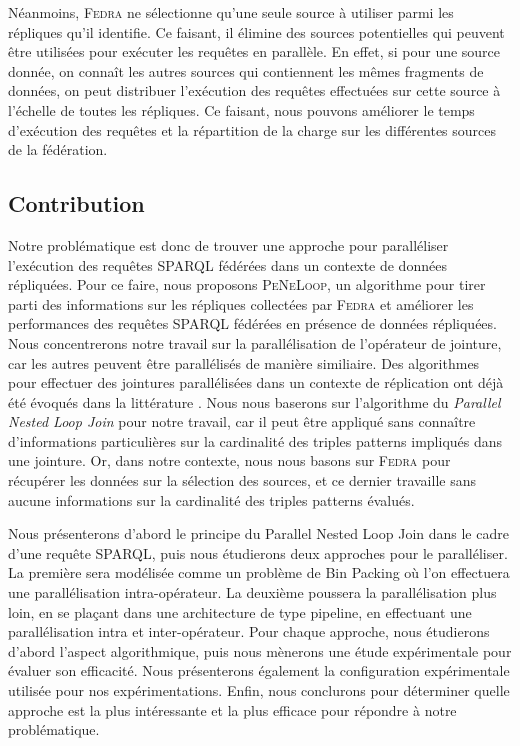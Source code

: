 \documentclass[a4paper]{article}
\def\sparql{\textsc{SPARQL}\xspace}
\def\fedra{\textsc{Fedra}\xspace}
\def\peneloop{\textsc{PeNeLoop}\xspace}
\begin{document}


Néanmoins, \fedra ne sélectionne qu'une seule source à utiliser parmi les répliques qu'il identifie. Ce faisant, il élimine des sources potentielles qui peuvent être utilisées pour exécuter les requêtes en parallèle. En effet, si pour une source donnée, on connaît les autres sources qui contiennent les mêmes fragments de données, on peut distribuer l'exécution des requêtes effectuées sur cette source à l'échelle de toutes les répliques. Ce faisant, nous pouvons améliorer le temps d'exécution des requêtes et la répartition de la charge sur les différentes sources de la fédération.

\subsection{Contribution}

Notre problématique est donc de trouver une approche pour paralléliser l'exécution des requêtes \sparql fédérées dans un contexte de données répliquées. Pour ce faire, nous proposons \peneloop, un algorithme pour tirer parti des informations sur les répliques collectées par \fedra et améliorer les performances des requêtes \sparql fédérées en présence de données répliquées. Nous concentrerons notre travail sur la parallélisation de l'opérateur de jointure, car les autres peuvent être parallélisés de manière similiaire. Des algorithmes pour effectuer des jointures parallélisées dans un contexte de réplication ont déjà été évoqués dans la littérature \cite{ozsu2011principles}. Nous nous baserons sur l'algorithme du \textit{Parallel Nested Loop Join} pour notre travail, car il peut être appliqué sans connaître d'informations particulières sur la cardinalité des triples patterns impliqués dans une jointure. Or, dans notre contexte, nous nous basons sur \fedra pour récupérer les données sur la sélection des sources, et ce dernier travaille sans aucune informations sur la cardinalité des triples patterns évalués.

Nous présenterons d'abord le principe du Parallel Nested Loop Join dans le cadre d'une requête \sparql, puis nous étudierons deux approches pour le paralléliser. La première sera modélisée comme un problème de Bin Packing \cite{kantorovich1960mathematical} où l'on effectuera une parallélisation intra-opérateur. La deuxième poussera la parallélisation plus loin, en se plaçant dans une architecture de type pipeline, en effectuant une parallélisation intra et inter-opérateur. Pour chaque approche, nous étudierons d'abord l'aspect algorithmique, puis nous mènerons une étude expérimentale pour évaluer son efficacité. Nous présenterons également la configuration expérimentale utilisée pour nos expérimentations. Enfin, nous conclurons pour déterminer quelle approche est la plus intéressante et la plus efficace pour répondre à notre problématique.
\end{document}
